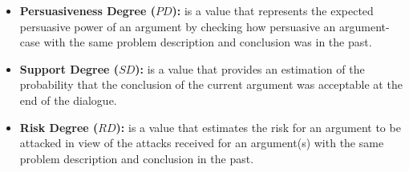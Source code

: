 \begin{itemize}
 \item\textbf{Persuasiveness Degree ($PD$):} is a value that represents the expected persuasive power of an argument by checking how persuasive an argument-case with the same problem description and conclusion was in the past. %

 \item\textbf{Support Degree ($SD$):} is a value that provides an estimation of the probability that the conclusion of the current argument was acceptable at the end of the dialogue. %

 \item\textbf{Risk Degree ($RD$):} is a value that estimates the risk for an argument to be attacked in view of the attacks received for an argument(s) with the same problem description and conclusion in the past. %


\end{itemize}
